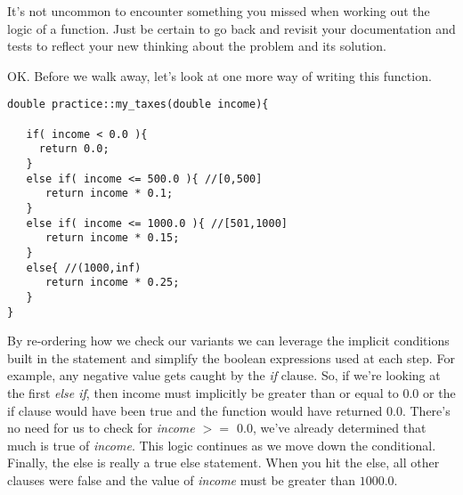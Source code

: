 \documentclass[]{tufte-handout}
\begin{document}
It's not uncommon to encounter something you missed when working out the logic of a function.  Just be certain to go back and revisit your documentation and tests to reflect your new thinking about the problem and its solution.


OK. Before we walk away, let's look at one more way of writing this function.
\begin{verbatim}
double practice::my_taxes(double income){

   if( income < 0.0 ){
     return 0.0;
   } 
   else if( income <= 500.0 ){ //[0,500]
      return income * 0.1;
   }
   else if( income <= 1000.0 ){ //[501,1000]
      return income * 0.15;   
   }
   else{ //(1000,inf) 
      return income * 0.25;   
   }
}
\end{verbatim}

By re-ordering how we check our variants we can leverage the implicit conditions built in the statement and simplify the boolean expressions used at each step. For example, any negative value gets caught by the \textit{if} clause. So, if we're looking at the first \textit{else if}, then income must implicitly be greater than or equal to $0.0$ or the if clause would have been true and the function would have returned $0.0$. There's no need for us to check for \textit{income $>=$ $0.0$}, we've already determined that much is true of \textit{income}. This logic continues as we move down the conditional. Finally, the else is really a true else statement.  When you hit the else, all other clauses were false and the value of \textit{income} must be greater than $1000.0$.
\end{document}
